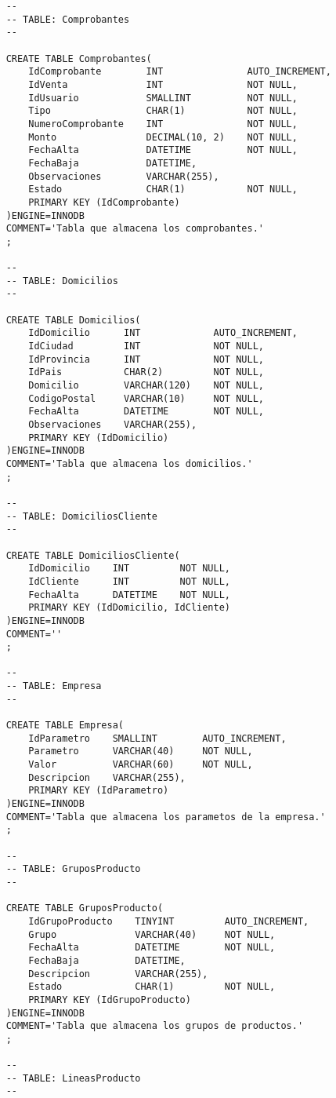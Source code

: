 \begin{lstlisting}
	-- 
	-- TABLE: Comprobantes 
	--

	CREATE TABLE Comprobantes(
		IdComprobante        INT               AUTO_INCREMENT,
		IdVenta              INT               NOT NULL,
		IdUsuario            SMALLINT          NOT NULL,
		Tipo                 CHAR(1)           NOT NULL,
		NumeroComprobante    INT               NOT NULL,
		Monto                DECIMAL(10, 2)    NOT NULL,
		FechaAlta            DATETIME          NOT NULL,
		FechaBaja            DATETIME,
		Observaciones        VARCHAR(255),
		Estado               CHAR(1)           NOT NULL,
		PRIMARY KEY (IdComprobante)
	)ENGINE=INNODB
	COMMENT='Tabla que almacena los comprobantes.'
	;

	-- 
	-- TABLE: Domicilios 
	--

	CREATE TABLE Domicilios(
		IdDomicilio      INT             AUTO_INCREMENT,
		IdCiudad         INT             NOT NULL,
		IdProvincia      INT             NOT NULL,
		IdPais           CHAR(2)         NOT NULL,
		Domicilio        VARCHAR(120)    NOT NULL,
		CodigoPostal     VARCHAR(10)     NOT NULL,
		FechaAlta        DATETIME        NOT NULL,
		Observaciones    VARCHAR(255),
		PRIMARY KEY (IdDomicilio)
	)ENGINE=INNODB
	COMMENT='Tabla que almacena los domicilios.'
	;

	-- 
	-- TABLE: DomiciliosCliente 
	--

	CREATE TABLE DomiciliosCliente(
		IdDomicilio    INT         NOT NULL,
		IdCliente      INT         NOT NULL,
		FechaAlta      DATETIME    NOT NULL,
		PRIMARY KEY (IdDomicilio, IdCliente)
	)ENGINE=INNODB
	COMMENT=''
	;

	-- 
	-- TABLE: Empresa 
	--

	CREATE TABLE Empresa(
		IdParametro    SMALLINT        AUTO_INCREMENT,
		Parametro      VARCHAR(40)     NOT NULL,
		Valor          VARCHAR(60)     NOT NULL,
		Descripcion    VARCHAR(255),
		PRIMARY KEY (IdParametro)
	)ENGINE=INNODB
	COMMENT='Tabla que almacena los parametos de la empresa.'
	;

	-- 
	-- TABLE: GruposProducto 
	--

	CREATE TABLE GruposProducto(
		IdGrupoProducto    TINYINT         AUTO_INCREMENT,
		Grupo              VARCHAR(40)     NOT NULL,
		FechaAlta          DATETIME        NOT NULL,
		FechaBaja          DATETIME,
		Descripcion        VARCHAR(255),
		Estado             CHAR(1)         NOT NULL,
		PRIMARY KEY (IdGrupoProducto)
	)ENGINE=INNODB
	COMMENT='Tabla que almacena los grupos de productos.'
	;

	-- 
	-- TABLE: LineasProducto 
	--


\end{lstlisting}
